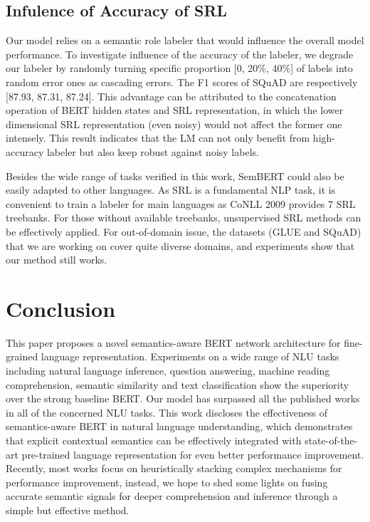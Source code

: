 \documentclass[letterpaper]{article} \usepackage{aaai20}  \usepackage{times}  \usepackage{helvet} \usepackage{courier}  \usepackage[hyphens]{url}  \usepackage{graphicx} \urlstyle{rm} \def\UrlFont{\rm}  \usepackage{graphicx}  \frenchspacing  \usepackage{amssymb}
\begin{document}
\subsection{Infulence of Accuracy of SRL}
Our model relies on a semantic role labeler that would influence the overall model performance. To investigate influence of the accuracy of the labeler, we degrade our labeler by randomly turning specific proportion [0, 20\%, 40\%] of labels into random error ones as cascading errors. The F1 scores of SQuAD are respectively [87.93, 87.31, 87.24]. This advantage can be attributed to the concatenation operation of BERT hidden states and SRL representation, in which the lower dimensional SRL representation (even noisy)  would not affect the former one intensely. This result indicates that the LM can not only benefit from high-accuracy labeler but also keep robust against noisy labels.

Besides the wide range of tasks verified in this work, SemBERT could also be easily adapted to other languages. As SRL is a fundamental NLP task, it is convenient to train a labeler for main languages as CoNLL 2009 provides 7 SRL treebanks. For those without available treebanks, unsupervised SRL methods can be effectively applied. For out-of-domain issue, the datasets (GLUE and SQuAD) that we are working on cover quite diverse domains, and experiments show that our method still works.

\section{Conclusion}\label{sec:concl}
This paper proposes a novel semantics-aware BERT network architecture for fine-grained language representation. Experiments on a wide range of NLU tasks including natural language inference, question answering, machine reading comprehension, semantic similarity and text classification show the superiority over the strong baseline BERT. Our model has surpassed all the published works in all of the concerned NLU tasks. This work discloses the effectiveness of semantics-aware BERT in natural language understanding, which demonstrates that explicit contextual semantics can be effectively integrated with state-of-the-art pre-trained language representation for even better performance improvement. Recently, most works focus on heuristically stacking complex mechanisms for performance improvement, instead, we hope to shed some lights on fusing accurate semantic signals for deeper comprehension and inference through a simple but effective method. 



\end{document}
